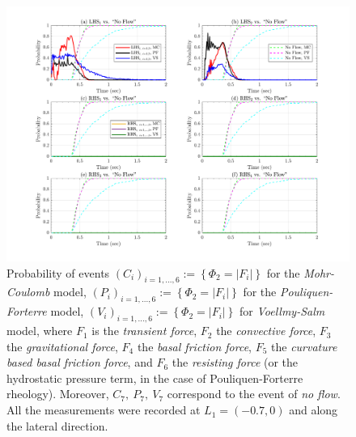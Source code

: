 \documentclass{article}
\begin{document}
\begin{figure}[H]
        \centering
        \includegraphics[width=1\textwidth]{InclinedPlane/LocalRecords/DominancePrY_L1.png}
        \caption{Probability of events $(C_i)_{i=1,...,6}:=\left\{\Phi_2=|F_i|\right\}$ for the \emph{Mohr-Coulomb} model, $(P_i)_{i=1,...,6}:=\left\{\Phi_2=|F_i|\right\}$ for the \emph{Pouliquen-Forterre} model, $(V_i)_{i=1,...,6}:=\left\{\Phi_2=|F_i|\right\}$ for \emph{Voellmy-Salm} model, where $F_1$ is the \emph{transient force}, $F_2$ the \emph{convective force}, $F_3$ the \emph{gravitational force}, $F_4$ the \emph{basal friction force}, $F_5$ the \emph{curvature based basal friction force}, and $F_6$ the \emph{resisting force} (or the hydrostatic pressure term, in the case of Pouliquen-Forterre rheology). Moreover, $C_7,\ P_7,\ V_7$ correspond to the event of \emph{no flow}. All the measurements were recorded at $L_1=(-0.7,0)$ and along the lateral direction.}
        \label{fig:Ramp-FYDominance-L1}
\end{figure}
\end{document}
